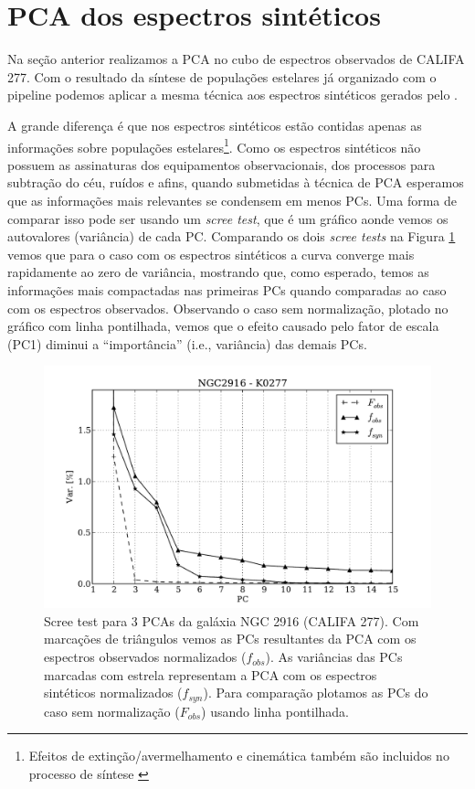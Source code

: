 \section{PCA dos espectros sintéticos}
\label{sec:PCAaplic:OBSxSYN}

Na seção anterior realizamos a PCA no cubo de espectros observados de CALIFA 277. Com o resultado da síntese de
populações estelares já organizado com o pipeline \pycasso podemos aplicar a mesma técnica aos espectros sintéticos
gerados pelo \starlight.

A grande diferença é que nos espectros sintéticos estão contidas apenas as informações sobre populações
estelares\footnote{Efeitos de extinção/avermelhamento e cinemática também são incluidos no processo de síntese
\citep{CidFernandes2005}}. Como os espectros sintéticos não possuem as assinaturas dos equipamentos observacionais, dos
processos para subtração do céu, ruídos e afins, quando submetidas à técnica de PCA esperamos que as informações mais
relevantes se condensem em menos PCs. Uma forma de comparar isso pode ser usando um {\em scree test}, que é um gráfico
aonde vemos os autovalores (variância) de cada PC. Comparando os dois {\em scree tests} na Figura \ref{fig:K0277scree}
vemos que para o caso com os espectros sintéticos a curva converge mais rapidamente ao zero de variância, mostrando que,
como esperado, temos as informações mais compactadas nas primeiras PCs quando comparadas ao caso com os espectros
observados. Observando o caso sem normalização, plotado no gráfico com linha pontilhada, vemos que o efeito causado pelo
fator de escala (PC1) diminui a ``importância'' (i.e., variância) das demais PCs.

\begin{figure}
    \includegraphics[width=1.\textwidth]{figuras/K0277-screetest.pdf}
    \caption[Scree test comparativo entre 3 PCAs.]
    {Scree test para 3 PCAs da galáxia NGC 2916 (CALIFA 277). Com marcações de triângulos vemos as PCs resultantes
    da PCA com os espectros observados normalizados ($f_{obs}$). As variâncias das PCs marcadas com estrela
    representam a PCA com os espectros sintéticos normalizados ($f_{syn}$). Para comparação plotamos as PCs do
    caso sem normalização ($F_{obs}$) usando linha pontilhada.}
    \label{fig:K0277scree}
\end{figure}

